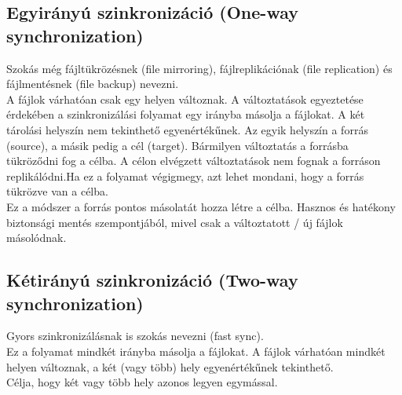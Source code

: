 \subsection{Egyirányú szinkronizáció (One-way synchronization)}
Szokás még fájltükrözésnek (file mirroring), fájlreplikációnak (file replication) és fájlmentésnek (file backup) nevezni.
\vspace{5pt} \\A fájlok várhatóan csak egy helyen változnak. A változtatások egyeztetése érdekében a szinkronizálási folyamat egy irányba másolja a fájlokat. A két tárolási helyszín nem tekinthető egyenértékűnek. Az egyik helyszín a forrás (source), a másik pedig a cél (target). Bármilyen változtatás a forrásba tükröződni fog a célba. A célon elvégzett változtatások nem fognak a forráson replikálódni.Ha ez a folyamat végigmegy, azt lehet mondani, hogy a forrás tükrözve van a célba.
\vspace{5pt} \\Ez a módszer a forrás pontos másolatát hozza létre a célba. Hasznos és hatékony biztonsági mentés szempontjából, mivel csak a változtatott / új fájlok másolódnak.


\subsection{Kétirányú szinkronizáció (Two-way synchronization)}
Gyors szinkronizálásnak is szokás nevezni (fast sync).
\vspace{5pt} \\Ez a folyamat mindkét irányba másolja a fájlokat. A fájlok várhatóan mindkét helyen változnak, a két (vagy több) hely egyenértékűnek tekinthető.
\vspace{5pt} \\Célja, hogy két vagy több hely azonos legyen egymással.



